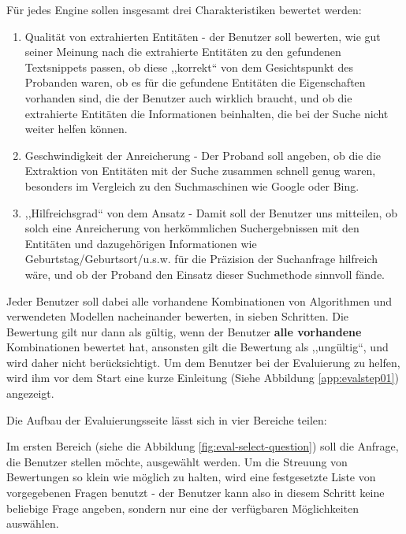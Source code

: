 Für jedes Engine sollen insgesamt drei Charakteristiken bewertet werden:
\begin{enumerate}
\item Qualität von extrahierten Entitäten - der Benutzer soll bewerten, wie gut seiner Meinung nach die extrahierte Entitäten zu den gefundenen Textsnippets passen, ob diese ,,korrekt`` von dem Gesichtspunkt des Probanden waren, ob es für die gefundene Entitäten die Eigenschaften vorhanden sind, die der Benutzer auch wirklich braucht, und ob die extrahierte Entitäten die Informationen beinhalten, die bei der Suche nicht weiter helfen können.
\item Geschwindigkeit der Anreicherung - Der Proband soll angeben, ob die die Extraktion von Entitäten mit der Suche zusammen schnell genug waren, besonders im Vergleich zu den Suchmaschinen wie Google oder Bing.
\item ,,Hilfreichsgrad`` von dem Ansatz - Damit soll der Benutzer uns mitteilen, ob solch eine Anreicherung von herkömmlichen Suchergebnissen mit den Entitäten und dazugehörigen Informationen wie Geburtstag/Geburtsort/u.s.w. für die Präzision der Suchanfrage hilfreich wäre, und ob der Proband den Einsatz dieser Suchmethode sinnvoll fände.  
\end{enumerate}
Jeder Benutzer soll dabei alle vorhandene Kombinationen von Algorithmen und verwendeten Modellen nacheinander bewerten, in sieben Schritten. Die Bewertung gilt nur dann als gültig, wenn der Benutzer \textbf{alle vorhandene} Kombinationen bewertet hat, ansonsten gilt die Bewertung als ,,ungültig``, und wird daher nicht berücksichtigt. Um dem Benutzer bei der Evaluierung zu helfen, wird ihm vor dem Start eine kurze Einleitung (Siehe Abbildung \ref{app:evalstep01}) angezeigt.

Die Aufbau der Evaluierungsseite lässt sich in vier Bereiche teilen:

Im ersten Bereich (siehe die Abbildung \ref{fig:eval-select-question}) soll die Anfrage, die Benutzer stellen möchte, ausgewählt werden. Um die Streuung von Bewertungen so klein wie möglich zu halten, wird eine festgesetzte Liste von vorgegebenen Fragen benutzt - der Benutzer kann also in diesem Schritt keine beliebige Frage angeben, sondern nur eine der verfügbaren Möglichkeiten auswählen.


